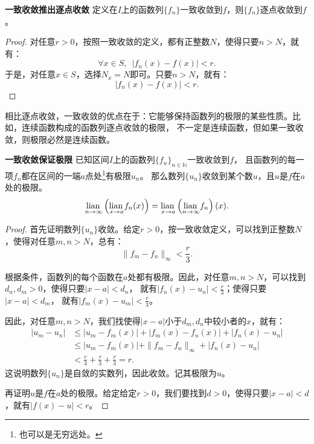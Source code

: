 \documentclass[12pt,UTF8]{ctexbook}
\begin{document}
\begin{appendix}
\begin{tm}{\textbf{一致收敛推出逐点收敛}}
    定义在$I$上的函数列$\{f_n\}$一致收敛到$f$，则$\{f_n\}$逐点收敛到$f$。
\end{tm}

\begin{proof}
    对任意$r>0$，按照一致收敛的定义，都有正整数$N$，使得只要$n>N$，就有：
    $$ \forall x\in S, \,\,\,|f_n(x) - f(x) | < r.$$
    于是，对任意$x\in S$，选择$N_x = N$即可。只要$n>N$，就有：
    $$ |f_n(x) - f(x) | < r.$$
\end{proof}

相比逐点收敛，一致收敛的优点在于：它能够保持函数列的极限的某些性质。比如，连续函数构成的函数列逐点收敛的极限，
不一定是连续函数，但如果一致收敛，则极限必然是连续函数。

\begin{tm}{\textbf{一致收敛保证极限}}
    已知区间$I$上的函数列$\{f_n\}_{n\in\mathbb{N}}$一致收敛到$f$，
    且函数列的每一项$f_n$都在区间的一端$a$点处\footnote{也可以是无穷远处。}有极限$u_n$。
    那么数列$\{u_n\}$收敛到某个数$u$，且$u$是$f$在$a$处的极限。
    $$ \underset{n\to \infty}{\operatorname{lian}\,} \left(\underset{x\to a}{\operatorname{lian}\,} f_n(x) \right) = \underset{x\to a}{\operatorname{lian}\,} \left(\underset{n\to \infty}{\operatorname{lian}\,} f_n\right)(x). $$
\end{tm}

\begin{proof}
    首先证明数列$\{u_n\}$收敛。给定$r>0$，按一致收敛定义，可以找到正整数$N$，使得对任意$m,n>N$，总有：
    $$ \| f_m - f_n\|_{\infty} < \frac{r}{3}.$$

    根据条件，函数列的每个函数在$a$处都有极限。因此，对任意$m,n>N$，可以找到$d_n, d_m > 0$，使得只要$|x - a| < d_n$，
    就有$|f_n(x) - u_n| < \frac{r}{3}$；使得只要$|x - a| < d_m$，
    就有$|f_m(x) - u_m| < \frac{r}{3}$。

    因此，对任意$m,n>N$，我们找使得$|x - a|$小于$d_m, d_n$中较小者的$x$，就有：
    \begin{align*}
        |u_m - u_n| &\leqslant |u_m - f_m(x)| + |f_m(x) - f_n(x)| + |f_n(x) - u_n| \\
        &\leqslant |u_m - f_m(x)| + \| f_m - f_n\|_{\infty} + |f_n(x) - u_n| \\
        &< \frac{r}{3} + \frac{r}{3} + \frac{r}{3} = r.
    \end{align*}
    这说明数列$\{u_n\}$是自敛的实数列，因此收敛。记其极限为$u$。

    再证明$u$是$f$在$a$处的极限。给定给定$r>0$，我们要找到$d>0$，使得只要$|x - a| < d$，就有$|f(x) - u| < r$。
    

\end{proof}
\end{appendix}
\end{document}
